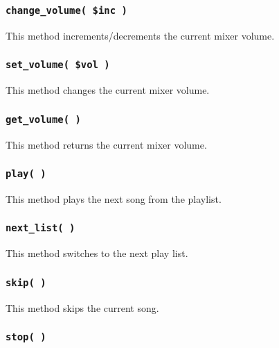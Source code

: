 \documentclass[12pt,a4paper]{article}
\begin{document}
\subsubsection*{\texttt{change\_volume( \$inc )}\label{xpl-mplayer_change_volume_inc_}}


This method increments/decrements the current mixer volume.

\subsubsection*{\texttt{set\_volume( \$vol )}\label{xpl-mplayer_set_volume_vol_}}


This method changes the current mixer volume.

\subsubsection*{\texttt{get\_volume( )}\label{xpl-mplayer_get_volume_}}


This method returns the current mixer volume.

\subsubsection*{\texttt{play( )}\label{xpl-mplayer_play_}}


This method plays the next song from the playlist.

\subsubsection*{\texttt{next\_list( )}\label{xpl-mplayer_next_list_}}


This method switches to the next play list.

\subsubsection*{\texttt{skip( )}\label{xpl-mplayer_skip_}}


This method skips the current song.

\subsubsection*{\texttt{stop( )}\label{xpl-mplayer_stop_}}
\end{document}
